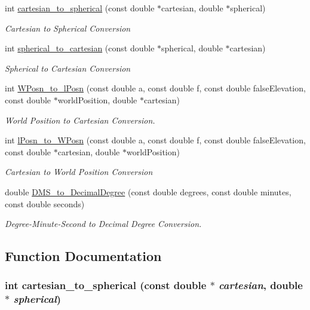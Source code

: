 \begin{CompactItemize}
int \hyperlink{group__Coordinate_ge470f6de804ac4cbd9248238562ba0a2}{cartesian\_\-to\_\-spherical} (const double $\ast$cartesian, double $\ast$spherical)
\begin{CompactList}\small\item\em Cartesian to Spherical Conversion \item\end{CompactList}\item 
int \hyperlink{group__Coordinate_g17c6892e2beefcd95412a53c01815940}{spherical\_\-to\_\-cartesian} (const double $\ast$spherical, double $\ast$cartesian)
\begin{CompactList}\small\item\em Spherical to Cartesian Conversion \item\end{CompactList}\item 
int \hyperlink{group__Coordinate_gc93c21c7f2c3b69bd38c0123bba28b36}{WPosn\_\-to\_\-lPosn} (const double a, const double f, const double falseElevation, const double $\ast$worldPosition, double $\ast$cartesian)
\begin{CompactList}\small\item\em World Position to Cartesian Conversion. \item\end{CompactList}\item 
int \hyperlink{group__Coordinate_g79ace4a7c8d0331aa300fdb5a68e16ec}{lPosn\_\-to\_\-WPosn} (const double a, const double f, const double falseElevation, const double $\ast$cartesian, double $\ast$worldPosition)
\begin{CompactList}\small\item\em Cartesian to World Position Conversion \item\end{CompactList}\item 
double \hyperlink{group__Coordinate_g9e353934d40cb8dc6e102003b945acdd}{DMS\_\-to\_\-DecimalDegree} (const double degrees, const double minutes, const double seconds)
\begin{CompactList}\small\item\em Degree-Minute-Second to Decimal Degree Conversion. \item\end{CompactList}\end{CompactItemize}


\subsection{Function Documentation}
\hypertarget{group__Coordinate_ge470f6de804ac4cbd9248238562ba0a2}{
\subsubsection[cartesian\_\-to\_\-spherical]{\setlength{\rightskip}{0pt plus 5cm}int cartesian\_\-to\_\-spherical (const double $\ast$ {\em cartesian}, \/  double $\ast$ {\em spherical})}}
\label{group__Coordinate_ge470f6de804ac4cbd9248238562ba0a2}


